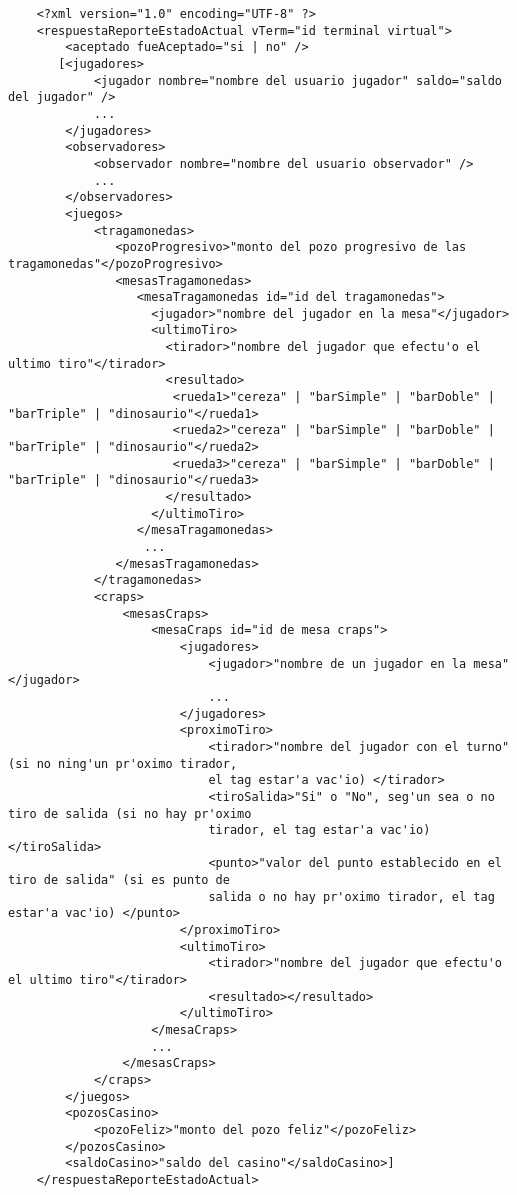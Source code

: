 \begin{verbatim}
    <?xml version="1.0" encoding="UTF-8" ?>
    <respuestaReporteEstadoActual vTerm="id terminal virtual">
        <aceptado fueAceptado="si | no" />
       [<jugadores>
            <jugador nombre="nombre del usuario jugador" saldo="saldo del jugador" />
            ... 
        </jugadores>
        <observadores>
            <observador nombre="nombre del usuario observador" />
            ...
        </observadores>
        <juegos>
            <tragamonedas>
               <pozoProgresivo>"monto del pozo progresivo de las tragamonedas"</pozoProgresivo>
               <mesasTragamonedas>
                  <mesaTragamonedas id="id del tragamonedas">
                    <jugador>"nombre del jugador en la mesa"</jugador>
                    <ultimoTiro>
                      <tirador>"nombre del jugador que efectu'o el ultimo tiro"</tirador>
                      <resultado>
                       <rueda1>"cereza" | "barSimple" | "barDoble" | "barTriple" | "dinosaurio"</rueda1>
                       <rueda2>"cereza" | "barSimple" | "barDoble" | "barTriple" | "dinosaurio"</rueda2>
                       <rueda3>"cereza" | "barSimple" | "barDoble" | "barTriple" | "dinosaurio"</rueda3>
                      </resultado>
                    </ultimoTiro>
                  </mesaTragamonedas>
                   ...
               </mesasTragamonedas>
            </tragamonedas>
            <craps>
                <mesasCraps>
                    <mesaCraps id="id de mesa craps">
                        <jugadores>
                            <jugador>"nombre de un jugador en la mesa"</jugador>
                            ...
                        </jugadores>
                        <proximoTiro>
                            <tirador>"nombre del jugador con el turno" (si no ning'un pr'oximo tirador,
                            el tag estar'a vac'io) </tirador>
                            <tiroSalida>"Si" o "No", seg'un sea o no tiro de salida (si no hay pr'oximo
                            tirador, el tag estar'a vac'io) </tiroSalida>
                            <punto>"valor del punto establecido en el tiro de salida" (si es punto de
                            salida o no hay pr'oximo tirador, el tag estar'a vac'io) </punto>
                        </proximoTiro>
                        <ultimoTiro>
                            <tirador>"nombre del jugador que efectu'o el ultimo tiro"</tirador>
                            <resultado></resultado>
                        </ultimoTiro>
                    </mesaCraps>
                    ...
                </mesasCraps>
            </craps>
        </juegos>
        <pozosCasino>
            <pozoFeliz>"monto del pozo feliz"</pozoFeliz>
        </pozosCasino>
        <saldoCasino>"saldo del casino"</saldoCasino>]
    </respuestaReporteEstadoActual>
\end{verbatim}


